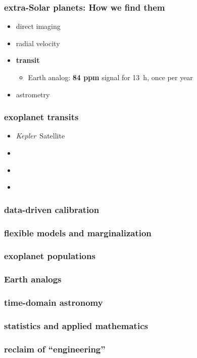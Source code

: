 \documentclass{beamer}
\renewcommand{\emph}[1]{\textbf{#1}}
\newcommand{\project}[1]{\textsl{#1}}
\newcommand{\Kepler}{\project{Kepler}}
\begin{document}
\begin{frame}
  \frametitle{extra-Solar planets: How we find them}
  \begin{itemize}
  \item direct imaging
  \item radial velocity
  \item \emph{transit}
    \begin{itemize}
    \item Earth analog: \emph{84 ppm} signal for 13~h, once per year
    \end{itemize}
  \item astrometry
  \end{itemize}
\end{frame}

\begin{frame}
  \frametitle{exoplanet transits}
  \begin{itemize}
  \item \Kepler\ Satellite
  \item ~
  \item ~
  \item ~
  \end{itemize}
\end{frame}

\begin{frame}
  \frametitle{data-driven calibration}
\end{frame}

\begin{frame}
  \frametitle{flexible models and marginalization}
\end{frame}

\begin{frame}
  \frametitle{exoplanet populations}
\end{frame}

\begin{frame}
  \frametitle{Earth analogs}
\end{frame}

\begin{frame}
  \frametitle{time-domain astronomy}
\end{frame}

\begin{frame}
  \frametitle{statistics and applied mathematics}
\end{frame}

\begin{frame}
  \frametitle{reclaim of ``engineering''}
\end{frame}
\end{document}

